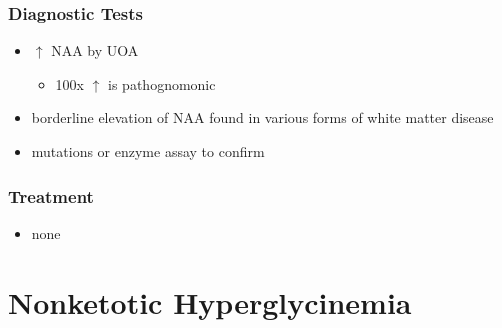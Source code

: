 \documentclass{scrartcl}
\begin{document}
\subsubsection{Diagnostic Tests}
\label{sec:orgeecbc42}
\begin{itemize}
\item \(\uparrow\) NAA by UOA
\begin{itemize}
\item 100x \(\uparrow\) is pathognomonic
\end{itemize}
\item borderline elevation of NAA found in various forms of white matter
disease
\item mutations or enzyme assay to confirm
\end{itemize}

\subsubsection{Treatment}
\label{sec:orgf8dad09}
\begin{itemize}
\item none
\end{itemize}

\section{Nonketotic Hyperglycinemia}
\label{sec:org19f2aa7}
\end{document}
